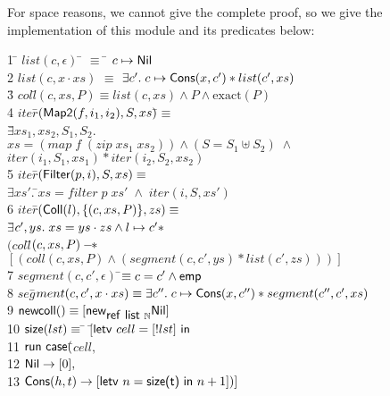 \documentclass[preprint,natbib]{sigplanconf}
\begin{document}
For space reasons, we cannot give the complete proof, so we give the
implementation of this module and its predicates below:
{\small
\begin{tabbing}
1 \qquad \= $list(c, \epsilon)$ \qquad\= $\equiv$ \= $c \mapsto \mbox{\textsf{{Nil}}}$ \\
2 \> $list(c, x\cdot xs)$ \> $\equiv$ \> 
   $\exists c'.\; c \mapsto \mbox{\textsf{{Cons}}}(x, c') * list(c', xs)$ 
\\[0.5em]
3\qquad \= $coll$\=$(c, xs, P) \equiv list(c, xs) \land P \land \mbox{exact}(P)$ \\[0.5em]
4 \> $iter$\=$(\mbox{\textsf{{Map2}}}(f, i_1, i_2), S, xs)$\=$ \equiv$ \= \\ 
\> \>         $\exists$\=$xs_1, xs_2, S_1, S_2.$ \\
\> \>\>$xs = (map\; f\; (zip\; xs_1\; xs_2)) \land (S = S_1 \uplus S_2) \;\land$\\
\> \>\>$iter(i_1, S_1, xs_1) * iter(i_2, S_2, xs_2)$ \\
5 \> $iter$\=$(\mbox{\textsf{{Filter}}}(p, i), S, xs) \equiv$ \\
\> \>\>      $\exists xs'.\;$\=$xs = filter\;p\;xs' \;\land\; iter(i, S, xs')$ \\
6 \> $iter$\=$(\mbox{\textsf{{Coll}}}(l), \{{(c, xs, P)}\}, zs) \equiv$ \= \\
\> \> $\exists$\=$ c', ys.\; xs = ys \cdot zs \land l \mapsto c' * $ \\
\> \> $(coll$\=$(c, xs, P) -\!\!*\;$\\ 
\> \> \> \!\!\!\!$[(coll(c, xs, P) \land (segment(c, c', ys) * list(c', zs)))]$
\\[0.5em]
7 \> $segment(c, c', \epsilon)$ \qquad\=$\equiv c = c' \land \mathsf{emp}$ \\
8 \> $seg$\=$ment(c, c', x\cdot xs) \equiv \exists c''.\; c \mapsto \mbox{\textsf{{Cons}}}(x, c'') * segment(c'', c', xs)$
\\[0.5em]

9 \> $\mbox{\textsf{{newcoll}}}() \equiv [\mbox{\textsf{{new}}}_{\mbox{\textsf{{ref }}}\mbox{\textsf{{list }}}{\mathbb{N}}} \mbox{\textsf{{Nil}}}]$ 
\\[0.5em]
10 \> $\mbox{\textsf{{size}}}(lst) \equiv$ \=  $[$\=$ \mbox{\textsf{{letv }}}cell = [!lst]\mbox{\textsf{{ in }}}$ \\
11 \> \> \> $\mbox{\textsf{{run }}}{}\mbox{\textsf{{case}}}($\=$cell,$ \\
12 \> \> \> \> $\mbox{\textsf{{Nil}}} \to [0], $ \\
13 \> \> \> \> $\mbox{\textsf{{Cons}}}(h,t) \to [\mbox{\textsf{{letv }}}n = \mbox{\textsf{{size(t)}}}\mbox{\textsf{{ in }}}n + 1])]$ 
\\[0.5em]


\end{tabbing}}
\end{document}
